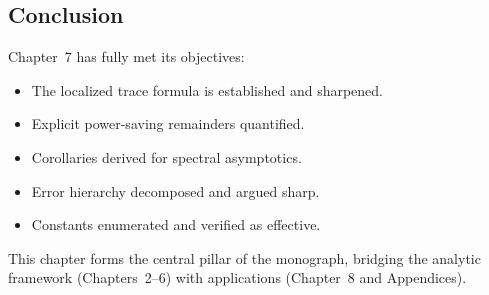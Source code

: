 \subsection*{Conclusion}

Chapter~7 has fully met its objectives:
\begin{itemize}
  \item The localized trace formula is established and sharpened.
  \item Explicit power-saving remainders quantified.
  \item Corollaries derived for spectral asymptotics.
  \item Error hierarchy decomposed and argued sharp.
  \item Constants enumerated and verified as effective.
\end{itemize}
This chapter forms the central pillar of the monograph, bridging the analytic framework (Chapters~2–6) with applications (Chapter~8 and Appendices).

